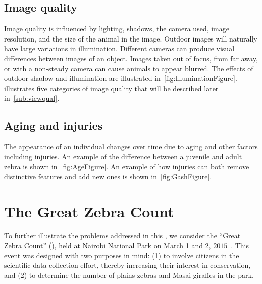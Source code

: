     \subsection{Image quality}
        Image quality is influenced by lighting, shadows, the camera used, image resolution, and the size of the animal
        in the image. Outdoor images will naturally have large variations in illumination. Different cameras can produce
        visual differences between images of an object. Images taken out of focus, from far away, or with a non-steady
        camera can cause animals to appear blurred. The effects of outdoor shadow and illumination are illustrated
        in~\cref{fig:IlluminationFigure}.  illustrates five categories of image quality that
        will be described later in~\cref{sub:viewqual}.

        \IlluminationFigure{}

        \QualityFigure{}

    \FloatBarrier{}
    \subsection{Aging and injuries}
        The appearance of an individual changes over time due to aging and other factors including injuries. An example
        of the difference between a juvenile and adult zebra is shown in~\cref{fig:AgeFigure}. An example of how
        injuries can both remove distinctive features and add new ones is shown in~\cref{fig:GashFigure}.

        \AgeFigure{}

        \GashFigure{}

\FloatBarrier{}
\section{The Great Zebra Count}\label{sec:introgzc}

    To further illustrate the problems addressed in this \thesis{}, we consider the ``Great Zebra Count'' (\GZC{}),
    held at Nairobi National Park on March 1\st{} and 2\nd{}, $2015$~\cite{rubenstein_great_2015}. This event was
    designed with two purposes in mind: (1) to involve citizens in the scientific data collection effort, thereby
    increasing their interest in conservation, and (2) to determine the number of plains zebras and Masai giraffes
    in the park.

